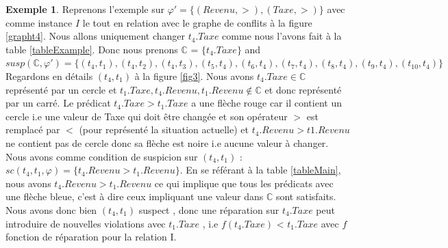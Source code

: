 \documentclass[letterpaper, 12pt]{report}
\theoremstyle{definition}
\newtheorem{mydef}{Définition}
\newtheorem{mylemma}{Lemme}
\newtheorem{myexample}{Exemple}
\begin{document}
%
%
%
%
%

\begin{myexample}

Reprenons l'exemple sur $\varphi' = \{(Revenu,>),(Taxe,>) \}$ avec comme instance $I$ le tout en relation avec le graphe de conflits à la figure \ref{grapht4}. Nous allons uniquement changer $t_4.Taxe$ comme nous l'avons fait à la table \ref{tableExample}. Donc nous prenons $\mathbb{C}$ =  $\{ t_4.Taxe \}$ and $susp(\mathbb{C},\varphi') = \{( t_4 , t_1) , 
( t_4 , t_2),
( t_4 , t_3),
( t_5 , t_4),
( t_6 , t_4),
( t_7 , t_4),
( t_8 , t_4),
( t_9 , t_4),
( t_{10} , t_4) \}$ Regardons en détails $(t_4,t_1)$ à la figure \ref{fig3}. Nous avons $t_4.Taxe \in \mathbb{C}$ représenté par un cercle et $t_1.Taxe, t_4.Revenu, t_1.Revenu \not\in \mathbb{C}$ et donc représenté par un carré. Le prédicat $t_4.Taxe > t_1.Taxe$ a une flèche rouge car il contient un cercle i.e une valeur de Taxe qui doit être changée et son opérateur $>$ est remplacé par $<$ (pour représenté la situation actuelle) et $t_4.Revenu > t1.Revenu$ ne contient pas de cercle donc sa flèche est noire i.e aucune valeur à changer. \\

Nous avons comme condition de suspicion sur $(t_4,t_1)$ : $sc(t_4,t_1,\varphi) = \{ t_4.Revenu > t_1.Revenu\}$. En se référant à la table \ref{tableMain}, nous avons $t_4.Revenu > t_1.Revenu$ ce qui implique que tous les prédicats avec une flèche bleue, c'est à dire ceux impliquant une valeur dans $\mathbb{C}$ sont satisfaits. Nous avons donc bien $(t_4,t_1)$ suspect , donc une réparation sur $t_4.Taxe$ peut introduire de nouvelles violations avec $t_1.Taxe$ , i.e $f(t_4.Taxe)$ < $t_1.Taxe$ avec $f$ fonction de réparation pour la relation I.
\end{myexample}
\end{document}
